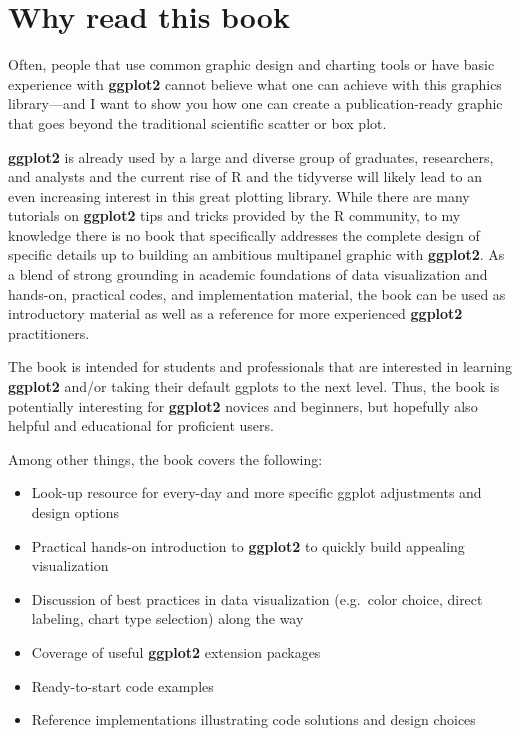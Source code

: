 \documentclass[
]{krantz}
\providecommand{\tightlist}{%
  \setlength{\itemsep}{0pt}\setlength{\parskip}{0pt}}
\begin{document}
\hypertarget{why-read-this-book}{%
\section*{Why read this book}\label{why-read-this-book}}


Often, people that use common graphic design and charting tools or have basic experience with \textbf{ggplot2} cannot believe what one can achieve with this graphics library---and I want to show you how one can create a publication-ready graphic that goes beyond the traditional scientific scatter or box plot.

\textbf{ggplot2} is already used by a large and diverse group of graduates, researchers, and analysts and the current rise of R and the tidyverse will likely lead to an even increasing interest in this great plotting library. While there are many tutorials on \textbf{ggplot2} tips and tricks provided by the R community, to my knowledge there is no book that specifically addresses the complete design of specific details up to building an ambitious multipanel graphic with \textbf{ggplot2}. As a blend of strong grounding in academic foundations of data visualization and hands-on, practical codes, and implementation material, the book can be used as introductory material as well as a reference for more experienced \textbf{ggplot2} practitioners.

The book is intended for students and professionals that are interested in learning \textbf{ggplot2} and/or taking their default ggplots to the next level. Thus, the book is potentially interesting for \textbf{ggplot2} novices and beginners, but hopefully also helpful and educational for proficient users.

Among other things, the book covers the following:

\begin{itemize}
\tightlist
\item
  Look-up resource for every-day and more specific ggplot adjustments and design options
\item
  Practical hands-on introduction to \textbf{ggplot2} to quickly build appealing visualization
\item
  Discussion of best practices in data visualization (e.g.~color choice, direct labeling, chart type selection) along the way
\item
  Coverage of useful \textbf{ggplot2} extension packages
\item
  Ready-to-start code examples
\item
  Reference implementations illustrating code solutions and design choices
\end{itemize}
\end{document}
